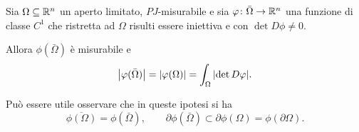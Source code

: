 \begin{theorem}
Sia $\Omega\subseteq {\mathbb R}^n$ un aperto limitato, $PJ$-misurabile e sia 
$\varphi\colon \bar \Omega\to {\mathbb R}^n$
una funzione di classe $C^1$ che ristretta ad $\Omega$ risulti essere 
iniettiva e con $\det D\phi\neq 0$.

Allora $\phi(\bar \Omega)$ è misurabile e
\begin{equation}\label{eq:area}
 {\left|\varphi(\bar \Omega)\right|} = {\left|\varphi(\Omega)\right|} = \int_\Omega {\left|\det D\varphi\right|}.
\end{equation}

Può essere utile osservare che in queste ipotesi si ha
\begin{equation}\label{eq:49638}
  \overline{\phi(\Omega)} = \phi(\bar \Omega), \qquad
          \partial \phi(\bar \Omega)
  \subset \partial \phi(\Omega)
  = \phi(\partial \Omega).
\end{equation}
\end{theorem}
%
